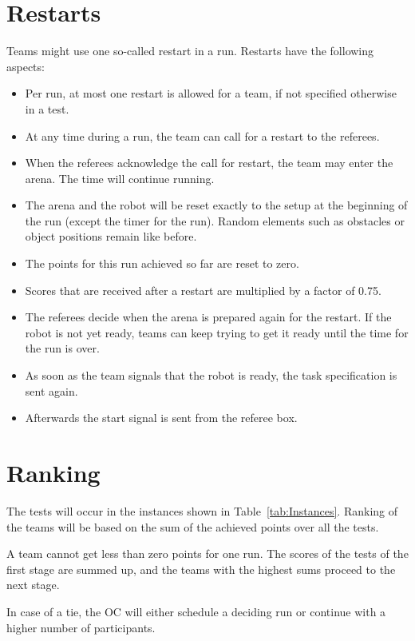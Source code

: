 \section{Restarts}
Teams might use one so-called restart in a run. Restarts have the following aspects:

\begin{itemize}

	\item Per run, at most one restart is allowed for a team, if not specified otherwise in a test.
	\item At any time during a run, the team can call for a restart to the referees.
	\item When the referees acknowledge the call for restart, the team may enter the arena. The time will continue running.
	\item The arena and the robot will be reset exactly to the setup at the beginning of the run (except the timer for the run). Random elements such as obstacles or object positions remain like before.
	\item The points for this run achieved so far are reset to zero.
	\item Scores that are received after a restart are multiplied by a factor of 0.75.
	\item The referees decide when the arena is prepared again for the restart. If the robot is not yet ready, teams can keep trying to get it ready until the time for the run is over.
	\item As soon as the team signals that the robot is ready, the task specification is sent again.
	\item Afterwards the start signal is sent from the referee box.

\end{itemize}


\section{Ranking}
The tests will occur in the instances shown in Table~\ref{tab:Instances}. Ranking of the teams will be based on the sum of the achieved points over all the tests.

A team cannot get less than zero points for one run.
The scores of the tests of the first stage are summed up, and the teams with the highest sums proceed to the next stage.

In case of a tie, the OC will either schedule a deciding run or continue with a higher number of participants.

